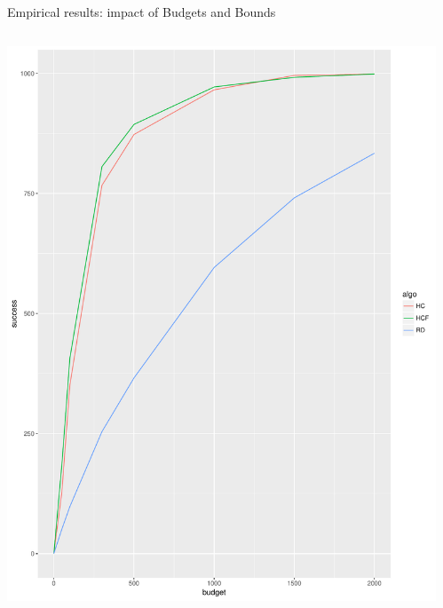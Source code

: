 \documentclass{beamer}
\begin{document}
\begin{frame}{Empirical results: impact of Budgets and Bounds}
\begin{columns}
\begin{column}{0.5\textwidth}
    \begin{center}
        \includegraphics[scale=0.25]{success_f_budget.pdf}
    \end{center}
\end{column}
\begin{column}{0.5\textwidth}
    \begin{center}

\end{center}
\end{column}
\end{columns}
\end{frame}
\end{document}
